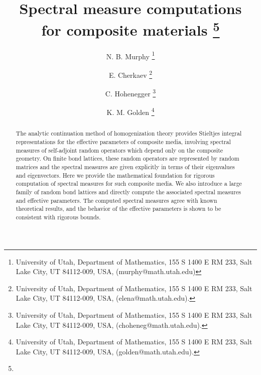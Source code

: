 \documentclass{cmslatex}
\begin{document}
\title{Spectral measure computations \\ for composite materials
\thanks{%
}}
%
\author{N. B. Murphy
\thanks {University of Utah, Department of Mathematics, 155 S 1400 E
  RM 233, Salt Lake City, UT 84112-009, USA, (murphy@math.utah.edu)}
%
\and E. Cherkaev
\thanks {University of Utah, Department of Mathematics, 155 S 1400 E
  RM 233, Salt Lake City, UT 84112-009, USA, (elena@math.utah.edu).}
%
\and C. Hohenegger
\thanks {University of Utah, Department of Mathematics, 155 S 1400 E
  RM 233, Salt Lake City, UT 84112-009, USA, (choheneg@math.utah.edu).}
%
\and K. M. Golden
\thanks {University of Utah, Department of Mathematics, 155 S 1400 E
  RM 233, Salt Lake City, UT 84112-009, USA, (golden@math.utah.edu).}
}



\pagestyle{myheadings} \maketitle

\begin{abstract}
The analytic continuation method of homogenization theory provides
Stieltjes integral representations for the effective parameters of
composite media, involving spectral measures of self-adjoint random
operators which depend only on the composite geometry. On finite bond
lattices, these random operators are represented by random matrices
and the spectral measures are given explicitly in terms of their
eigenvalues and eigenvectors. Here we provide the mathematical
foundation for rigorous computation of spectral measures for such
composite media. We also introduce a large family of random bond
lattices and directly compute the associated spectral measures and
effective parameters. The computed spectral measures agree with known
theoretical results, and the behavior of the effective parameters is
shown to be consistent with rigorous bounds. 
\end{abstract}
\end{document}
